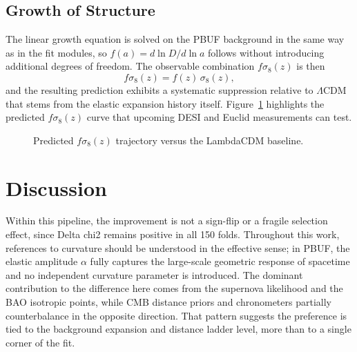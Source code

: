 \documentclass[11pt]{article}
\begin{document}
\clearpage
\subsection{Growth of Structure}

The linear growth equation is solved on the PBUF background in the same way as in the fit modules, so \(f(a) = d\ln D/d\ln a\) follows without introducing additional degrees of freedom.
The observable combination \(f\sigma_8(z)\) is then
\begin{equation}
f\sigma_8(z) = f(z)\,\sigma_8(z),
\end{equation}
and the resulting prediction exhibits a systematic suppression relative to \(\Lambda\)CDM that stems from the elastic expansion history itself.
Figure~\ref{fig:fsigma_pred} highlights the predicted \(f\sigma_8(z)\) curve that upcoming DESI and Euclid measurements can test.

\begin{figure}[ht]
\centering
{}
\caption{Predicted \(f\sigma_8(z)\) trajectory versus the LambdaCDM baseline.}
\label{fig:fsigma_pred}
\end{figure}

\FloatBarrier

\section{Discussion}
Within this pipeline, the improvement is not a sign-flip or a fragile selection effect, since Delta chi2 remains positive in all 150 folds.
Throughout this work, references to curvature should be understood in the effective sense; in PBUF, the elastic amplitude \(\alpha\) fully captures the large-scale geometric response of spacetime and no independent curvature parameter is introduced.
The dominant contribution to the difference here comes from the supernova likelihood and the BAO isotropic points, while CMB distance priors and chronometers partially counterbalance in the opposite direction.
That pattern suggests the preference is tied to the background expansion and distance ladder level, more than to a single corner of the fit.
\end{document}
